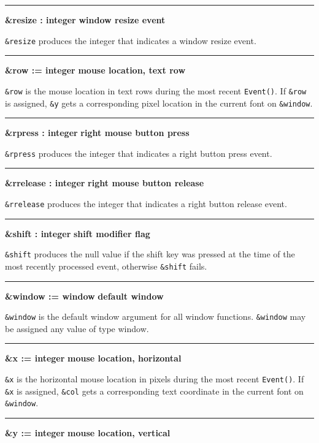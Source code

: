\bigskip\hrule\vspace{0.1cm}
\noindent
{\bf \&resize : integer } \hfill {\bf window resize event}

\noindent
\texttt{\&resize} produces the integer that indicates a window resize
event.

\bigskip\hrule\vspace{0.1cm}
\noindent
{\bf \&row := integer } \hfill {\bf mouse location, text row}

\noindent
\texttt{\&row} is the mouse location in text rows during the most recent
\texttt{Event()}. If \texttt{\&row} is assigned, \texttt{\&y} gets a
corresponding pixel location in the current font on \texttt{\&window}.

\bigskip\hrule\vspace{0.1cm}
\noindent
{\bf \&rpress : integer } \hfill {\bf right mouse button press}

\noindent
\texttt{\&rpress} produces the integer that indicates a right button
press event.

\bigskip\hrule\vspace{0.1cm}
\noindent
{\bf \&rrelease : integer } \hfill {\bf right mouse button release}

\noindent
\texttt{\&rrelease} produces the integer that indicates a right button
release event.

\bigskip\hrule\vspace{0.1cm}
\noindent
{\bf \&shift : integer } \hfill {\bf shift modifier flag}

\noindent
\texttt{\&shift} produces the null value if the shift key was pressed at
the time of the most recently processed event, otherwise
\texttt{\&shift} fails.

\bigskip\hrule\vspace{0.1cm}
\noindent
{\bf \&window := window } \hfill {\bf default window}

\noindent
\texttt{\&window} is the default window argument for all window
functions. \texttt{\&window} may be assigned any value of type
window.

\bigskip\hrule\vspace{0.1cm}
\noindent
{\bf \&x := integer } \hfill {\bf mouse location, horizontal}

\noindent
\texttt{\&x} is the horizontal mouse location in pixels during the most
recent \texttt{Event()}. If \texttt{\&x} is assigned, \texttt{\&col}
gets a corresponding text coordinate in the current font on
\texttt{\&window}.

\bigskip\hrule\vspace{0.1cm}
\noindent
{\bf \&y := integer } \hfill {\bf mouse location, vertical}

